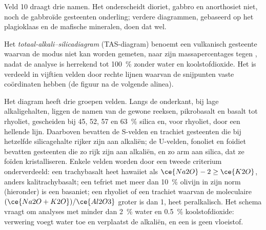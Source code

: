 \begin{omfigure}
\par{}
\end{omfigure}

Veld 10 draagt drie namen. Het  onderscheidt dioriet, gabbro en
anorthosiet niet, noch de gabbroïde gesteenten onderling; verdere diagrammen, gebaseerd op het
plagioklaas en de mafische mineralen, doen dat wel.

\begin{definition}\label{def:b2:magmatic-series:tas}
Het \emph{totaal-alkali--silicadiagram} (TAS-diagram)
benoemt een vulkanisch gesteente waarvan de modus niet kan worden gemeten, naar zijn
massapercentages  tegen , nadat de analyse is
herrekend tot \qty{100}{\percent} zonder water en koolstofdioxide. Het is verdeeld
in vijftien velden door rechte lijnen waarvan de snijpunten vaste coördinaten hebben
(de figuur na de volgende alinea).
\end{definition}

Het diagram heeft drie groepen velden. Langs de onderkant, bij lage alkaligehalten, liggen de
namen van de gewone reeksen, pikrobasalt en basalt tot rhyoliet, gescheiden bij 45, 52,
57 en \qty{63}{\percent} silica en, voor rhyoliet, door een hellende lijn. Daarboven bevatten de S-velden en trachiet gesteenten die bij hetzelfde silicagehalte rijker zijn aan
alkaliën; de U-velden, fonoliet en foidiet bevatten gesteenten die zo rijk zijn aan
alkaliën, en zo arm aan silica, dat ze foïden kristalliseren. Enkele velden worden
door een tweede criterium onderverdeeld: een trachybasalt heet hawaiiet als $\ce{Na2O} - 2
\ge \ce{K2O}$, anders kalitrachybasalt; een tefriet met meer dan
\qty{10}{\percent} olivijn in zijn norm (hieronder) is een basaniet; een rhyoliet of een trachiet waarvan
de moleculaire $(\ce{Na2O + K2O})/\ce{Al2O3}$ groter is dan 1, heet peralkalisch. Het schema
vraagt om analyses met minder dan \qty{2}{\percent} water en \qty{0.5}{\percent}
koolstofdioxide: verwering voegt water toe en verplaatst de alkaliën, en een  is geen
vloeistof.


